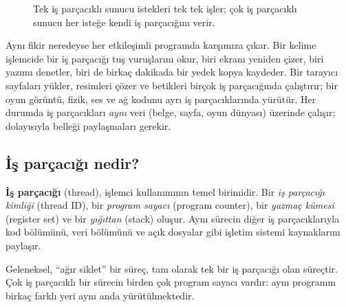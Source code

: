 \begin{figure}[H]
\centering
{}
\caption{Tek iş parçacıklı sunucu istekleri tek tek işler; çok iş parçacıklı sunucu her isteğe kendi iş parçacığını verir.}
\end{figure}

Aynı fikir neredeyse her etkileşimli programda karşımıza çıkar. Bir kelime işlemcide bir iş parçacığı tuş vuruşlarını okur, biri ekranı yeniden çizer, biri yazımı denetler, biri de birkaç dakikada bir yedek kopya kaydeder. Bir tarayıcı sayfaları yükler, resimleri çözer ve betikleri birçok iş parçacığında çalıştırır; bir oyun görüntü, fizik, ses ve ağ kodunu ayrı iş parçacıklarında yürütür. Her durumda iş parçacıkları \emph{aynı} veri (belge, sayfa, oyun dünyası) üzerinde çalışır; dolayısıyla belleği paylaşmaları gerekir.

\subsection{İş parçacığı nedir?}

\begin{keyidea}[Tanım]
\textbf{İş parçacığı} (thread), işlemci kullanımının temel birimidir. Bir \emph{iş parçacığı kimliği} (thread ID), bir \emph{program sayacı} (program counter), bir \emph{yazmaç kümesi} (register set) ve bir \emph{yığıttan} (stack) oluşur. Aynı sürecin diğer iş parçacıklarıyla kod bölümünü, veri bölümünü ve açık dosyalar gibi işletim sistemi kaynaklarını paylaşır.
\end{keyidea}

Geleneksel, ``ağır siklet'' bir süreç, tam olarak tek bir iş parçacığı olan süreçtir. Çok iş parçacıklı bir sürecin birden çok program sayacı vardır: aynı programın birkaç farklı yeri aynı anda yürütülmektedir.

